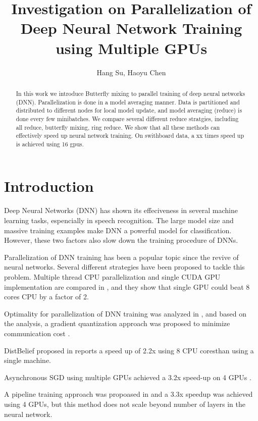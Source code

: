 \documentclass{article}
\title{Investigation on Parallelization of Deep Neural Network Training using Multiple GPUs}
\author{Hang Su, Haoyu Chen}
\date{}
\begin{document}
%
\maketitle
%
\begin{abstract}
In this work we introduce Butterfly mixing to parallel training of deep neural networks (DNN). Parallelization is done
in a model averaging manner. Data is partitioned and distributed to different nodes for local model update, and
model averaging (reduce) is done every few minibatches. We compare several different reduce stratgies, including
all reduce, butterfly mixing, ring reduce. We show that all these methods can effectively
speed up neural network training. On swithboard data, a xx times speed up is achieved using 16 gpus.

\end{abstract}
%
%
\section{Introduction}
\label{sec:intro}
Deep Neural Networks (DNN) has shown its effeciveness in several machine learning tasks, espencially in speech
recognition. The large model size and massive training examples make DNN a powerful model for classification. However,
these two factors also slow down the training procedure of DNNs.

Parallelization of DNN training has been a popular topic since the revive of neural networks. Several different strategies
have been proposed to tackle this problem. Multiple thread CPU parallelization and single CUDA GPU implementation are compared
in \cite{scanzio2010parallel,vesely2010parallel}, and they show that single GPU could beat 8 cores CPU by a factor of 2.

Optimality for parallelization of DNN training was analyzed in \cite{seide2014parallelizability}, and based on the analysis, 
a gradient quantization approach was proposed to minimize communication cost \cite{seide20141}.

DistBelief proposed in \cite{dean2012large} reports a speed up of 2.2x using 8 CPU coresthan using a
single machine.


Asynchronous SGD using multiple GPUs achieved a 3.2x speed-up on 4 GPUs \cite{zhang2013asynchronous}.

A pipeline training approach was propoased in \cite{chen2012pipelined} and a 3.3x speedup was achieved using 4 GPUs, but this
method does not scale beyond number of layers in the neural network.
\end{document}
